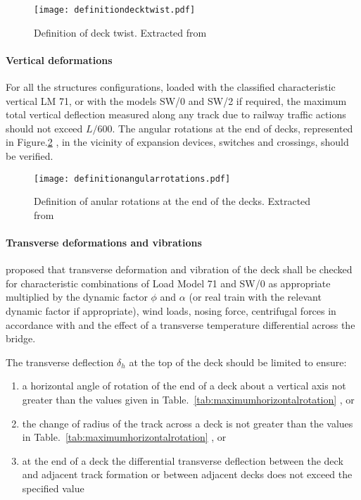 \begin{figure}[h]
	\centering
	\texttt{[image: definitiondecktwist.pdf]}
	\caption{Definition of deck twist. Extracted from \cite[Figure A2.1]{1990a2}}
	\label{fig:difinitiondecktwist}
\end{figure}

\paragraph{Vertical deformations}
For all the structures configurations, loaded with the classified characteristic vertical LM 71, or with the models SW/0 and SW/2 if required, the maximum  total vertical deflection measured along any track due to railway traffic actions should not exceed $L/600$. The angular rotations at the end of decks, represented in Figure.\ref{fig:difinitionangularrotations} , in the vicinity of expansion devices, switches and crossings, should be verified.

\begin{figure}[h]
	\centering
	\texttt{[image: definitionangularrotations.pdf]}
	\caption{Definition of anular rotations at the end of the decks. Extracted from \cite[Figure A2.2]{1990a2}}
	\label{fig:difinitionangularrotations}
\end{figure}

\paragraph{Transverse deformations and vibrations}\label{sec:Transverse-deformations-and-vibrations}
\cite[A2.4.4.2.4]{1990a2}  proposed that transverse deformation and vibration of the deck shall be checked for characteristic combinations of Load Model 71 and SW/0 as appropriate multiplied by the dynamic factor $\phi$ and $\alpha$ (or real train with the relevant dynamic factor if appropriate), wind loads, nosing force, centrifugal forces in accordance with \cite[6]{EC12} and the effect of a transverse temperature differential across the bridge.

The transverse deflection $ \delta_h $ at the top of the deck should be limited to ensure:

\begin{enumerate}
	\item a horizontal angle of rotation of the end of a deck about a vertical axis not greater than the values given in Table.~\ref{tab:maximumhorizontalrotation} , or
	\item the change of radius of the track across a deck is not greater than the values in Table.~\ref{tab:maximumhorizontalrotation} , or
	\item at the end of a deck the differential transverse deflection between the deck and adjacent track formation or between adjacent decks does not exceed the specified value
\end{enumerate}

